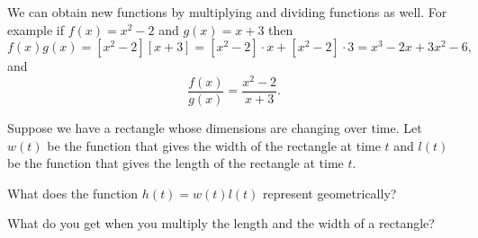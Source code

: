\documentclass{ximera}
\begin{document}
We can obtain new functions by multiplying and dividing functions as well. 
For example if $f(x)=x^2-2$ and $g(x)=x+3$ then 
\[
f(x)g(x)=[x^2-2][x+3]=[x^2-2]\cdot x+[x^2-2]\cdot 3=x^3-2x+3x^2-6,
\]
and
\[
\frac{f(x)}{g(x)}=\frac{x^2-2}{x+3}.
\]


\begin{question}
Suppose we have a rectangle whose dimensions are changing over time. Let $w(t)$ be the function that gives the width of the rectangle at time $t$ and $l(t)$ be the function that gives the length of the rectangle at time $t$.

What does the function $h(t)=w(t)l(t)$ represent geometrically?

\begin{hint}
What do you get when you multiply the length and the width of a rectangle? 
\end{hint}
\begin{multipleChoice}
\end{multipleChoice}

\end{question}
\end{document}
